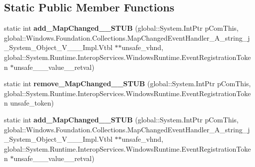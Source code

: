 \subsection*{Static Public Member Functions}
\begin{DoxyCompactItemize}
\item 
\mbox{\label{struct_windows_1_1_foundation_1_1_collections_1_1_i_observable_map___a__string__j___system___object___v_______impl_1_1_vtbl_aac385382fcbf569438a34de44b202394}} 
static int {\bfseries add\+\_\+\+Map\+Changed\+\_\+\+\_\+\+S\+T\+UB} (global\+::\+System.\+Int\+Ptr p\+Com\+This, global\+::\+Windows.\+Foundation.\+Collections.\+Map\+Changed\+Event\+Handler\+\_\+\+A\+\_\+string\+\_\+j\+\_\+\+System\+\_\+\+Object\+\_\+\+V\+\_\+\+\_\+\+\_\+\+Impl.\+Vtbl $\ast$$\ast$unsafe\+\_\+vhnd, global\+::\+System.\+Runtime.\+Interop\+Services.\+Windows\+Runtime.\+Event\+Registration\+Token $\ast$unsafe\+\_\+\+\_\+\+\_\+value\+\_\+\+\_\+retval)
\item 
\mbox{\label{struct_windows_1_1_foundation_1_1_collections_1_1_i_observable_map___a__string__j___system___object___v_______impl_1_1_vtbl_aeab9d91b53996d202ddf2ec84b918c08}} 
static int {\bfseries remove\+\_\+\+Map\+Changed\+\_\+\+\_\+\+S\+T\+UB} (global\+::\+System.\+Int\+Ptr p\+Com\+This, global\+::\+System.\+Runtime.\+Interop\+Services.\+Windows\+Runtime.\+Event\+Registration\+Token unsafe\+\_\+token)
\item 
\mbox{\label{struct_windows_1_1_foundation_1_1_collections_1_1_i_observable_map___a__string__j___system___object___v_______impl_1_1_vtbl_aac385382fcbf569438a34de44b202394}} 
static int {\bfseries add\+\_\+\+Map\+Changed\+\_\+\+\_\+\+S\+T\+UB} (global\+::\+System.\+Int\+Ptr p\+Com\+This, global\+::\+Windows.\+Foundation.\+Collections.\+Map\+Changed\+Event\+Handler\+\_\+\+A\+\_\+string\+\_\+j\+\_\+\+System\+\_\+\+Object\+\_\+\+V\+\_\+\+\_\+\+\_\+\+Impl.\+Vtbl $\ast$$\ast$unsafe\+\_\+vhnd, global\+::\+System.\+Runtime.\+Interop\+Services.\+Windows\+Runtime.\+Event\+Registration\+Token $\ast$unsafe\+\_\+\+\_\+\+\_\+value\+\_\+\+\_\+retval)

\end{DoxyCompactItemize}
